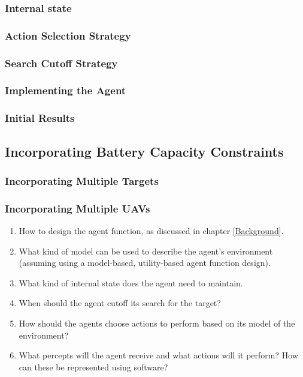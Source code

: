\subsubsection{Internal state}
\placeholder

\subsubsection{Action Selection Strategy}
\placeholder

\subsubsection{Search Cutoff Strategy}
\placeholder


\subsubsection{Implementing the Agent}
\placeholder

\subsubsection{Initial Results}
\placeholder

\subsection{Incorporating Battery Capacity Constraints}
\placeholder

\subsubsection{Incorporating Multiple Targets}
\placeholder

\subsubsection{Incorporating Multiple UAVs}
\placeholder



\begin{enumerate}
    \item How to design the agent function, as discussed in chapter \ref{Background}.
    \item What kind of model can be used to describe the agent's environment (assuming using a model-based, utility-based agent function design).
    \item What kind of internal state does the agent need to maintain.
    \item When should the agent cutoff its search for the target?
    \item How should the agents choose actions to perform based on its model of the environment?
    \item What percepts will the agent receive and what actions will it perform? How can these be represented using software?
\end{enumerate}

